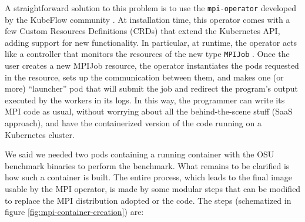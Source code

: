 A straightforward solution to this problem is to use the \texttt{mpi-operator}
developed by the KubeFlow community \cite{kubeflow-mpioperator}.
At installation time, this operator comes with a few Custom Resources
Definitions (CRDs) that extend the Kubernetes API, adding support for new
functionality.
In particular, at runtime, the operator acts like a controller that monitors the
resources of the new type \texttt{MPIJob} \cite{redhat-mpioperator}.
Once the user creates a new MPIJob resource, the operator instantiates the pods
requested in the resource, sets up the communication between them, and makes one
(or more) ``launcher'' pod that will submit the job and redirect the program's
output executed by the workers in its logs.
In this way, the programmer can write its MPI code as usual, without worrying
about all the behind-the-scene stuff (SaaS approach), and have the containerized
version of the code running on a Kubernetes cluster.

We said we needed two pods containing a running container with the OSU benchmark
binaries to perform the benchmark.
What remains to be clarified is how such a container is built.
The entire process, which leads to the final image usable by the MPI operator,
is made by some modular steps that can be modified to replace the MPI
distribution adopted or the code.
The steps (schematized in figure \ref{fig:mpi-container-creation}) are:


